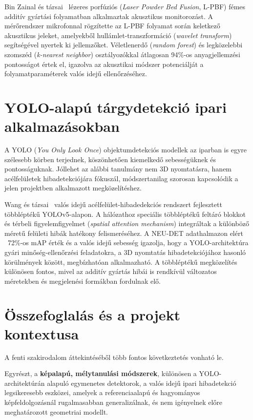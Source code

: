 Bin Zainal és társai~\cite{binzainal2025lpbf} lézeres porfúziós (\textit{Laser Powder Bed Fusion},
L-PBF) fémes additív gyártási folyamatban alkalmaztak akusztikus monitorozást. A mérőrendszer
mikrofonnal rögzítette az L-PBF folyamat során keletkező akusztikus jeleket, amelyekből hullámlet-transzformáció
(\textit{wavelet transform}) segítségével nyertek ki jellemzőket. Véletlenerdő (\textit{random forest})
és legközelebbi szomszéd (\textit{k-nearest neighbor}) osztályozókkal átlagosan 94\%-os
anyagjellemzési pontosságot értek el, igazolva az akusztikai módszer potenciálját a folyamatparaméterek
valós idejű ellenőrzéséhez.

\section{YOLO-alapú tárgydetekció ipari alkalmazásokban}

A YOLO (\textit{You Only Look Once}) objektumdetekciós modellek az iparban is egyre szélesebb
körben terjednek, köszönhetően kiemelkedő sebességüknek és pontosságuknak. Jóllehet az alábbi
tanulmány nem 3D nyomtatásra, hanem acélfelületek hibadetekciójára fókuszál, módszertanilag
szorosan kapcsolódik a jelen projektben alkalmazott megközelítéshez.

Wang és társai~\cite{wang2023yolov5steel} valós idejű acélfelület-hibadedekciós rendszert fejlesztett
többléptékű YOLOv5-alapon. A hálózathoz speciális többléptékű feltáró blokkot és térbeli figyelemfigyelmet
(\textit{spatial attention mechanism}) integráltak a különböző méretű felületi hibák hatékony
felismeréséhez. A NEU-DET adathalmazon elért ~72\%-os mAP érték és a valós idejű sebesség
igazolja, hogy a YOLO-architektúra gyári minőség-ellenőrzési feladatokra, a 3D nyomtatás
hibadetekciójához hasonló körülmények között, megbízhatóan alkalmazható. A többléptékű
megközelítés különösen fontos, mivel az additív gyártás hibái is rendkívül változatos méretekben
és megjelenési formákban fordulnak elő.

\section{Összefoglalás és a projekt kontextusa}

A fenti szakirodalom áttekintéséből több fontos következtetés vonható le.

Egyrészt, a \textbf{képalapú, mélytanulási módszerek}, különösen a YOLO-architektúrán alapuló
egymenetes detektorok, a valós idejű ipari hibadetekció legsikeresebb eszközei, amelyek a
referenciaalapú és hagyományos képfeldolgozásnál rugalmasabban generalizálnak, és nem igényelnek
előre meghatározott geometriai modellt.

